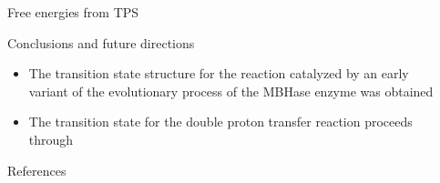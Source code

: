 \documentclass[final]{beamer}
\newlength{\sepwidth}
\newlength{\colwidth}
\newcommand{\separatorcolumn}{\begin{column}{\sepwidth}\end{column}}
\begin{document}
\begin{frame}[t]
\begin{columns}[t]
\begin{column}{\colwidth}
\begin{block}{Free energies from TPS}
  \end{block}
\begin{block}{Conclusions and future directions}
\begin{itemize}
    \item The transition state structure for the reaction catalyzed by an early 
    variant of the evolutionary process of the MBHase enzyme was obtained
    \item The transition state for the double proton transfer reaction proceeds through 
\end{itemize}
    
  \end{block}
  \begin{block}{References}

    \nocite{*}
    \footnotesize{}

  \end{block}

\end{column}

\separatorcolumn
\end{columns}
\end{frame}
\end{document}
